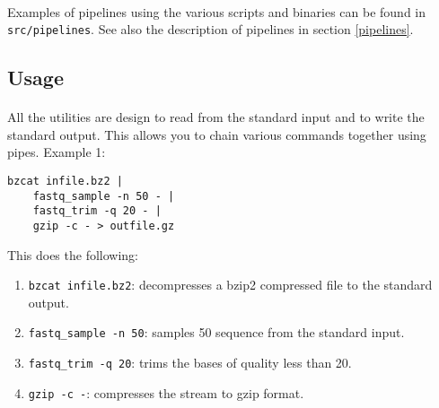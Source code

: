 \documentclass[a4paper,12pt]{article}
\begin{document}
\paragraph{}
Examples of pipelines using the various scripts and binaries can be found in
\texttt{src/pipelines}.
See also the description of pipelines in section \ref{pipelines}.


\subsection{Usage}

\paragraph{}
All the utilities are design to read from the standard input and to write the
standard output.
This allows you to chain various commands together using pipes.
Example 1:
\begin{verbatim}
bzcat infile.bz2 |
    fastq_sample -n 50 - |
    fastq_trim -q 20 - |
    gzip -c - > outfile.gz
\end{verbatim}
This does the following:
\begin{enumerate}
    \item \texttt{bzcat infile.bz2}: decompresses a bzip2 compressed file to
        the standard output.
    \item \texttt{fastq\_sample -n 50}: samples 50 sequence from the standard
        input.
    \item \texttt{fastq\_trim -q 20}: trims the bases of quality less than 20.
    \item \texttt{gzip -c -}: compresses the stream to gzip format.
\end{enumerate}
\end{document}
